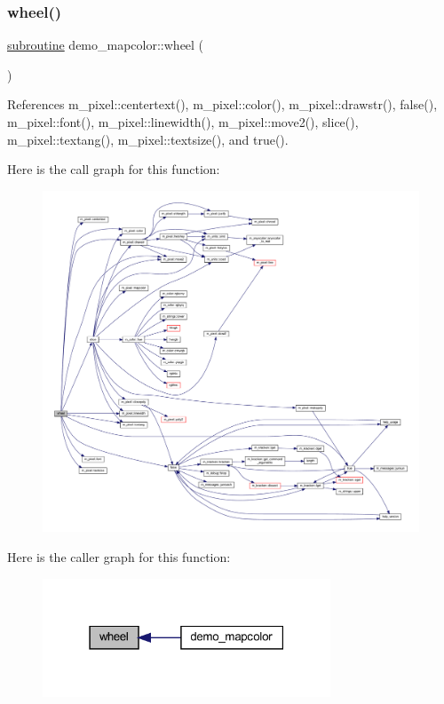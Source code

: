 \subsubsection{\texorpdfstring{wheel()}{wheel()}}
{\footnotesize\ttfamily \hyperlink{M__stopwatch_83_8txt_acfbcff50169d691ff02d4a123ed70482}{subroutine} demo\+\_\+mapcolor\+::wheel (\begin{DoxyParamCaption}{ }\end{DoxyParamCaption})}



References m\+\_\+pixel\+::centertext(), m\+\_\+pixel\+::color(), m\+\_\+pixel\+::drawstr(), false(), m\+\_\+pixel\+::font(), m\+\_\+pixel\+::linewidth(), m\+\_\+pixel\+::move2(), slice(), m\+\_\+pixel\+::textang(), m\+\_\+pixel\+::textsize(), and true().

Here is the call graph for this function\+:
\nopagebreak
\begin{figure}[H]
\begin{center}
\leavevmode
\includegraphics[width=350pt]{huegif_8f90_afc37db6c42d2e7bb12cb85b98d9eba9b_cgraph}
\end{center}
\end{figure}
Here is the caller graph for this function\+:
\nopagebreak
\begin{figure}[H]
\begin{center}
\leavevmode
\includegraphics[width=243pt]{huegif_8f90_afc37db6c42d2e7bb12cb85b98d9eba9b_icgraph}
\end{center}
\end{figure}
